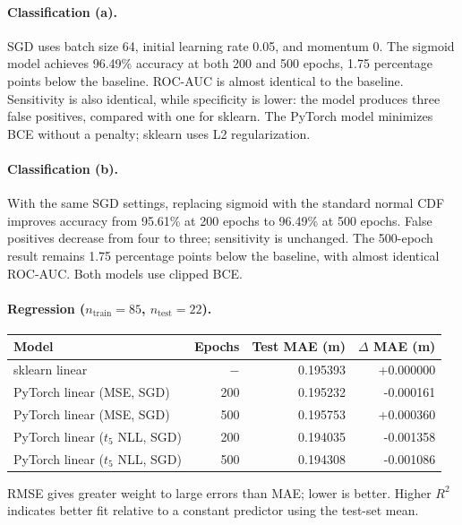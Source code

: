 \documentclass[11pt,a4paper]{article}
\begin{document}
\paragraph{Classification (a).} SGD uses batch size 64, initial learning rate 0.05, and momentum 0. The sigmoid model achieves 96.49\% accuracy at both 200 and 500 epochs, 1.75 percentage points below the baseline. ROC-AUC is almost identical to the baseline. Sensitivity is also identical, while specificity is lower: the model produces three false positives, compared with one for sklearn. The PyTorch model minimizes BCE without a penalty; sklearn uses L2 regularization.

\paragraph{Classification (b).} With the same SGD settings, replacing sigmoid with the standard normal CDF improves accuracy from 95.61\% at 200 epochs to 96.49\% at 500 epochs. False positives decrease from four to three; sensitivity is unchanged. The 500-epoch result remains 1.75 percentage points below the baseline, with almost identical ROC-AUC. Both models use clipped BCE.

\clearpage
\paragraph{Regression ($n_{\mathrm{train}}=85$, $n_{\mathrm{test}}=22$).}
\begin{center}
  \begin{tabular}{lrrr}
    \hline
    Model & Epochs & Test MAE (m) & $\Delta$ MAE (m) \\
    \hline
    sklearn linear & $-$ & 0.195393 & +0.000000 \\
    PyTorch linear (MSE, SGD) & 200 & 0.195232 & -0.000161 \\
    PyTorch linear (MSE, SGD) & 500 & 0.195753 & +0.000360 \\
    PyTorch linear ($t_5$ NLL, SGD) & 200 & 0.194035 & -0.001358 \\
    PyTorch linear ($t_5$ NLL, SGD) & 500 & 0.194308 & -0.001086 \\
    \hline
  \end{tabular}
\end{center}

RMSE gives greater weight to large errors than MAE; lower is better. Higher $R^2$ indicates better fit relative to a constant predictor using the test-set mean.
\end{document}
